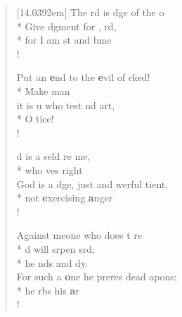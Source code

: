\begin{flushleft}
\begin{verse}[14.0392em]
 The rd is dge of the o\flagflex{\dag}\\*
Give dgment for ,  rd,\\*
for I am st and bme  \\!

 Put an \textbf{e}nd to the \textbf{e}vil of  cked!\\*
Make   man  \\
it is u who test nd  art,\\*
O   tice!\\!

 d is a seld re me,\\*
who ves  right  \\
 God is a dge, just and werful  tient,\\*
not \textbf{e}xercising \textbf{a}nger  \\!

 Against meone who does t re\flagflex{\dag}\\*
d will srpen  srd;\\*
he nds   and  dy.\\
 For such a \textbf{o}ne he preres dead apons;\\*
he rbs his \textbf{a}r  \\!


\end{verse}
\end{flushleft}
